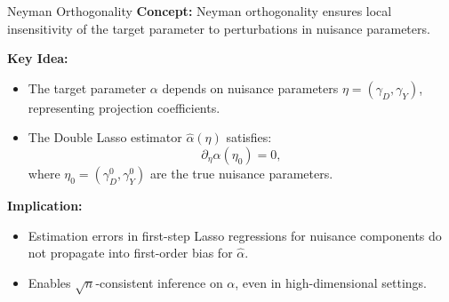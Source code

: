 \documentclass[xcolor=svgnames,t]{beamer}
\begin{document}
                \begin{frame}{Neyman Orthogonality }
                    \textbf{Concept:} Neyman orthogonality ensures local insensitivity of the target parameter to perturbations in nuisance parameters.
                    
                    \pause
                    
                    \textbf{Key Idea:}
                    \begin{itemize}
                        \item The target parameter \(\alpha\) depends on nuisance parameters \(\eta = (\gamma_D, \gamma_Y)\), representing projection coefficients.
                        \pause
                        \item The Double Lasso estimator \(\widehat{\alpha}(\eta)\) satisfies:
                        \[
                        \partial_\eta \alpha(\eta_0) = 0,
                        \]
                        where \(\eta_0 = (\gamma_D^0, \gamma_Y^0)\) are the true nuisance parameters.
                    \end{itemize}
                    
                    \pause
                    
                    \textbf{Implication:}
                    \begin{itemize}
                        \item Estimation errors in first-step Lasso regressions for nuisance components do not propagate into first-order bias for \(\widehat{\alpha}\).
                        \item Enables \(\sqrt{n}\)-consistent inference on \(\alpha\), even in high-dimensional settings.
                    \end{itemize}
                    \end{frame}
                            
\end{document}
